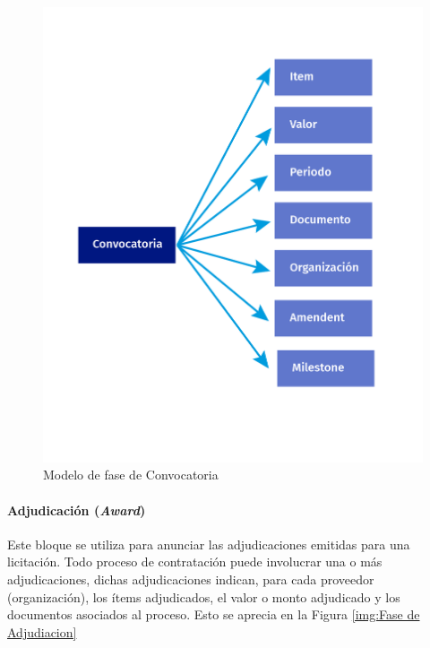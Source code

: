 \begin{figure}[htbp!]
    \centering
    \includegraphics[width=150mm]{figuras/Diagramas_Convocatoria.png}
    \caption{Modelo de fase de Convocatoria}
    \label{img:Fase de Convocatoria}
\end{figure}

\paragraph{Adjudicación (\textit{Award})}\hfill \break
Este bloque se utiliza para anunciar las adjudicaciones emitidas para una licitación. Todo proceso de contratación puede involucrar una o más adjudicaciones, dichas adjudicaciones indican, para cada proveedor (organización), los ítems adjudicados, el valor o monto adjudicado y los documentos asociados al proceso. Esto se aprecia en la Figura \ref{img:Fase de Adjudiacion}


